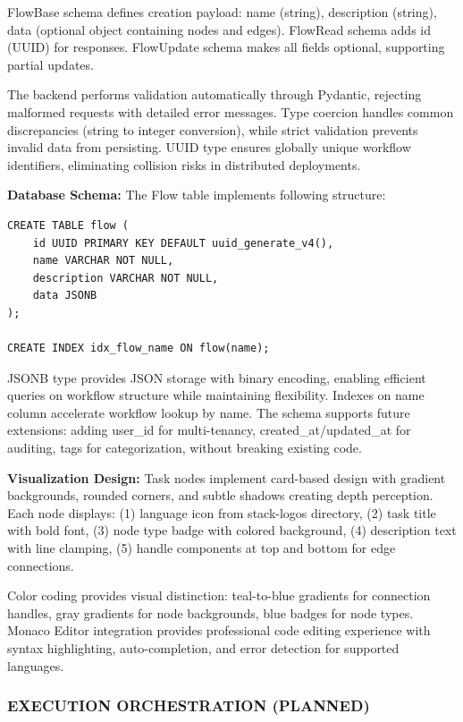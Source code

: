 \documentclass[12pt]{article}
\begin{document}
FlowBase schema defines creation payload: name (string), description (string), data (optional object containing nodes and edges). FlowRead schema adds id (UUID) for responses. FlowUpdate schema makes all fields optional, supporting partial updates.

The backend performs validation automatically through Pydantic, rejecting malformed requests with detailed error messages. Type coercion handles common discrepancies (string to integer conversion), while strict validation prevents invalid data from persisting. UUID type ensures globally unique workflow identifiers, eliminating collision risks in distributed deployments.

\hspace{\parindent}\textbf{Database Schema:} The Flow table implements following structure:

\begin{verbatim}
CREATE TABLE flow (
    id UUID PRIMARY KEY DEFAULT uuid_generate_v4(),
    name VARCHAR NOT NULL,
    description VARCHAR NOT NULL,
    data JSONB
);

CREATE INDEX idx_flow_name ON flow(name);
\end{verbatim}

JSONB type provides JSON storage with binary encoding, enabling efficient queries on workflow structure while maintaining flexibility. Indexes on name column accelerate workflow lookup by name. The schema supports future extensions: adding user\_id for multi-tenancy, created\_at/updated\_at for auditing, tags for categorization, without breaking existing code.

\hspace{\parindent}\textbf{Visualization Design:} Task nodes implement card-based design with gradient backgrounds, rounded corners, and subtle shadows creating depth perception. Each node displays: (1) language icon from stack-logos directory, (2) task title with bold font, (3) node type badge with colored background, (4) description text with line clamping, (5) handle components at top and bottom for edge connections.

Color coding provides visual distinction: teal-to-blue gradients for connection handles, gray gradients for node backgrounds, blue badges for node types. Monaco Editor integration provides professional code editing experience with syntax highlighting, auto-completion, and error detection for supported languages.

\subsubsection{EXECUTION ORCHESTRATION (PLANNED)}
\end{document}
